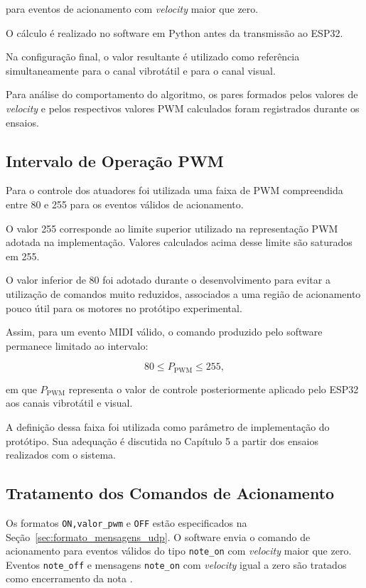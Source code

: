 para eventos de acionamento com \textit{velocity} maior que zero.

O cálculo é realizado no software em Python antes da transmissão ao ESP32.

Na configuração final, o valor resultante é utilizado como referência simultaneamente para o canal vibrotátil e para o canal visual.

Para análise do comportamento do algoritmo, os pares formados pelos valores de \textit{velocity} e pelos respectivos valores PWM calculados foram registrados durante os ensaios.


\subsection{Intervalo de Operação PWM}
\label{sec:intervalo_operacao_pwm}

Para o controle dos atuadores foi utilizada uma faixa de PWM compreendida entre 80 e 255 para os eventos válidos de acionamento.

O valor 255 corresponde ao limite superior utilizado na representação PWM adotada na implementação. Valores calculados acima desse limite são saturados em 255.

O valor inferior de 80 foi adotado durante o desenvolvimento para evitar a utilização de comandos muito reduzidos, associados a uma região de acionamento pouco útil para os motores no protótipo experimental.

Assim, para um evento MIDI válido, o comando produzido pelo software permanece limitado ao intervalo:

\begin{equation}
80 \leq P_{\mathrm{PWM}} \leq 255,
\label{eq:intervalo_pwm}
\end{equation}

em que $P_{\mathrm{PWM}}$ representa o valor de controle posteriormente aplicado pelo ESP32 aos canais vibrotátil e visual.

A definição dessa faixa foi utilizada como parâmetro de implementação do protótipo. Sua adequação é discutida no Capítulo 5 a partir dos ensaios realizados com o sistema.

\subsection{Tratamento dos Comandos de Acionamento}
\label{sec:comandos_acionamento}

Os formatos \texttt{ON,valor\_pwm} e \texttt{OFF} estão especificados na Seção~\ref{sec:formato_mensagens_udp}. O software envia o comando de acionamento para eventos válidos do tipo \texttt{note\_on} com \textit{velocity} maior que zero. Eventos \texttt{note\_off} e mensagens \texttt{note\_on} com \textit{velocity} igual a zero são tratados como encerramento da nota \cite{midi1996}.

